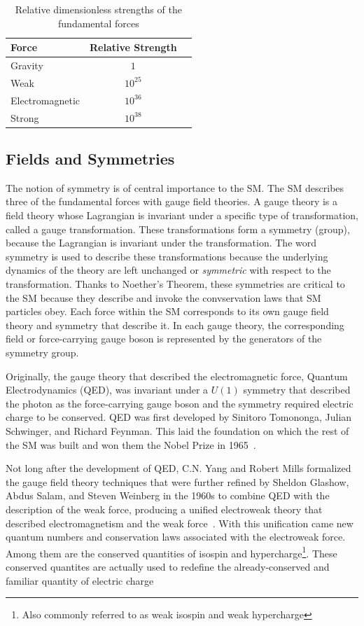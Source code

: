 \begin{table}[hbtp]
\centering
\caption{Relative dimensionless strengths of the fundamental forces}
\begin{tabular}{lcc}
\hline
Force & Relative Strength \\
\hline
Gravity & $1$ \\
Weak &  $10^{25}$ \\
Electromagnetic & $10^{36}$ \\
Strong & $10^{38}$ \\
\hline
\end{tabular}
\label{tab:force_table}
\end{table}


\subsection{Fields and Symmetries}
The notion of symmetry is of central importance to the SM.
The SM describes three of the fundamental forces with gauge field theories.
A gauge theory is a field theory whose Lagrangian is invariant under a specific type
of transformation, called a gauge transformation. These transformations form a symmetry (group), because the Lagrangian is invariant under the transformation.
The word symmetry is used to describe these transformations because
the underlying dynamics of the theory are left unchanged or \emph{symmetric} with respect to the transformation.
Thanks to Noether's Theorem, these symmetries are critical to the SM because they describe and invoke the convservation laws that SM particles obey.
Each force within the SM corresponds to its own gauge field theory
and symmetry that describe it. In each gauge theory, the corresponding field or force-carrying gauge boson is represented by the generators of the symmetry group. 

Originally, the gauge theory that described the electromagnetic force, Quantum Electrodynamics (QED), was invariant under a $U(1)$ symmetry that described the photon as the
force-carrying gauge boson and the symmetry required electric charge to be conserved. QED was first developed by Sinitoro Tomononga, Julian Schwinger, and Richard Feynman.
This laid the foundation on which the rest of the SM was built and won them the Nobel Prize in 1965~\cite{NP65}. 

Not long after the development of QED, C.N. Yang and Robert Mills formalized the gauge field theory techniques that were further refined by Sheldon Glashow, Abdus Salam,
and Steven Weinberg in the 1960s to combine QED
with the description of the weak force, producing a unified electroweak theory that described electromagnetism and the weak force~\cite{NP79}.
With this unification came new quantum numbers and conservation laws associated with the electroweak force. Among them are the conserved quantities of isospin and hypercharge\footnote{Also commonly
referred to as weak isospin and weak hypercharge}. These conserved quantites are actually used to redefine the already-conserved and familiar quantity of electric charge

